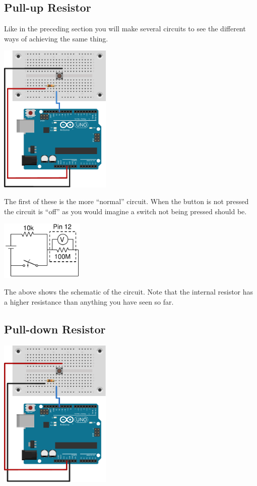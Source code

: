 \subsection{Pull-up Resistor}
Like in the preceding section you will make several circuits
to see the different ways of achieving the same thing.

\begin{center}
    \includegraphics[width=0.4\textwidth]{./Graphics/PullUp}
\end{center}

The first of these is the more ``normal'' circuit.
When the button is not pressed the circuit is ``off''
as you would imagine a switch not being pressed should be.

\begin{center}
    \includegraphics[width=0.3\textwidth]{./Graphics/PullUpCircuit}
\end{center}

The above shows the schematic of the circuit.
Note that the internal resistor has a higher resistance than anything
you have seen so far.


\subsection{Pull-down Resistor}
\begin{center}
    \includegraphics[width=0.4\textwidth]{./Graphics/PullDown}
\end{center}

